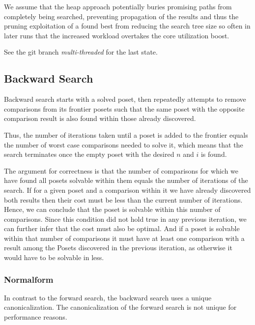 \documentclass[10pt,journal,compsoc]{IEEEtran}
\begin{document}
We assume that the heap approach potentially buries promising paths
from completely being searched, preventing propagation of the results 
and thus the pruning exploitation of a found best from reducing 
the search tree size so often in later runs that the increased
workload overtakes the core utilization boost.

See the git branch \textit{multi-threaded} for the last state. 

\subsection{Backward Search} \label{sec:backward}

Backward search starts with a solved poset, then repeatedly attempts to remove comparisons from its
frontier posets such that the same poset with the opposite comparison result is also found within
those already discovered.

Thus, the number of iterations taken until a poset is added to the frontier equals the number of
worst case comparisons needed to solve it, which means that the search terminates once the empty
poset with the desired $n$ and $i$ is found.

The argument for correctness is that the number of comparisons for which we have found all posets solvable within them equals the number of iterations of the search.
If for a given poset and a comparison within it we have already discovered both results then their cost must be less than the current number of iterations. Hence, we can conclude that the poset is solvable within this number of comparisons.
Since this condition did not hold true in any previous iteration, we can further infer that the cost must also be optimal.
And if a poset is solvable within
that number of comparisons it must have at least one comparison with a result among the Posets
discovered in the previous iteration, as otherwise it would have to be solvable in less.


\subsubsection{Normalform} \label{sec:backward:normal_form}

In contrast to the forward search, the backward search uses a unique canonicalization. %
The canonicalization of the forward search is not unique for performance reasons.
\end{document}
